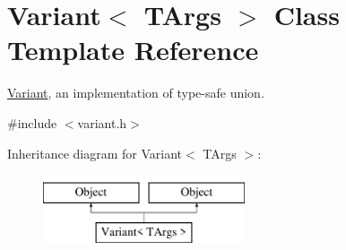 \hypertarget{classVariant}{}\section{Variant$<$ T\+Args $>$ Class Template Reference}
\label{classVariant}


\hyperlink{classVariant}{Variant}, an implementation of type-\/safe union.  




{\ttfamily \#include $<$variant.\+h$>$}

Inheritance diagram for Variant$<$ T\+Args $>$\+:\begin{figure}[H]
\begin{center}
\leavevmode
\includegraphics[height=2.000000cm]{classVariant}
\end{center}
\end{figure}
